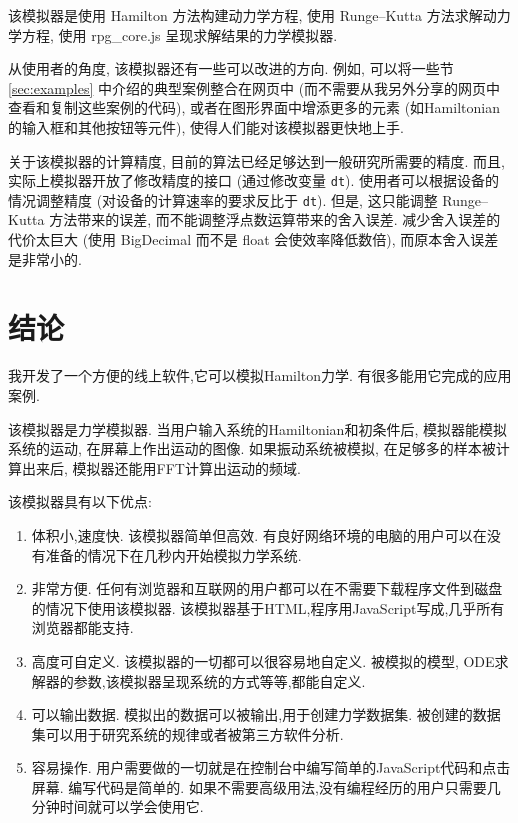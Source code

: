 \documentclass[12pt]{article}
\begin{document}
该模拟器是使用 Hamilton 方法构建动力学方程, 使用 Runge--Kutta 方法求解动力学方程, 使用 rpg\_core.js 呈现求解结果的力学模拟器.

从使用者的角度, 该模拟器还有一些可以改进的方向.
例如, 可以将一些节 \ref{sec:examples} 中介绍的典型案例整合在网页中 (而不需要从我另外分享的网页中查看和复制这些案例的代码),
或者在图形界面中增添更多的元素 (如Hamiltonian的输入框和其他按钮等元件),
使得人们能对该模拟器更快地上手.

关于该模拟器的计算精度, 目前的算法已经足够达到一般研究所需要的精度.
而且, 实际上模拟器开放了修改精度的接口 (通过修改变量 \texttt{dt}).
使用者可以根据设备的情况调整精度 (对设备的计算速率的要求反比于 \texttt{dt}).
但是, 这只能调整 Runge--Kutta 方法带来的误差, 而不能调整浮点数运算带来的舍入误差.
减少舍入误差的代价太巨大 (使用 BigDecimal 而不是 float 会使效率降低数倍),
而原本舍入误差是非常小的.

\section{结论}

我开发了一个方便的线上软件,它可以模拟Hamilton力学.
有很多能用它完成的应用案例.

该模拟器是力学模拟器.
当用户输入系统的Hamiltonian和初条件后,
模拟器能模拟系统的运动,
在屏幕上作出运动的图像.
如果振动系统被模拟,
在足够多的样本被计算出来后,
模拟器还能用FFT计算出运动的频域.

该模拟器具有以下优点:
\begin{enumerate}
  \item 体积小,速度快.
  该模拟器简单但高效.
  有良好网络环境的电脑的用户可以在没有准备的情况下在几秒内开始模拟力学系统.

  \item 非常方便.
  任何有浏览器和互联网的用户都可以在不需要下载程序文件到磁盘的情况下使用该模拟器.
  该模拟器基于HTML,程序用JavaScript写成,几乎所有浏览器都能支持.

  \item 高度可自定义.
  该模拟器的一切都可以很容易地自定义.
  被模拟的模型, ODE求解器的参数,该模拟器呈现系统的方式等等,都能自定义.

  \item 可以输出数据.
  模拟出的数据可以被输出,用于创建力学数据集.
  被创建的数据集可以用于研究系统的规律或者被第三方软件分析.

  \item 容易操作.
  用户需要做的一切就是在控制台中编写简单的JavaScript代码和点击屏幕.
  编写代码是简单的.
  如果不需要高级用法,没有编程经历的用户只需要几分钟时间就可以学会使用它.
\end{enumerate}
\end{document}
